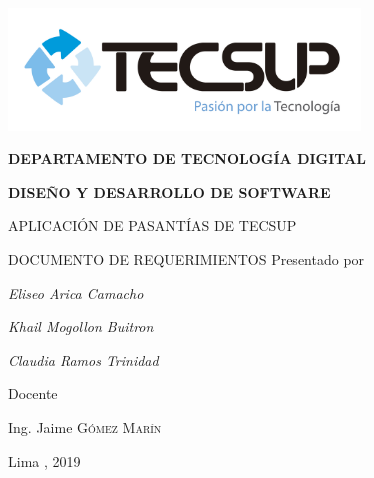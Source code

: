 \begin{titlepage}
	\centering
	\includegraphics[width=0.70\textwidth]{img/logo_tecsup_final}\par\vspace{1cm}
	\vspace{0.30cm}	
	{\scshape\large\bfseries DEPARTAMENTO DE TECNOLOG\'IA DIGITAL\par}
	\vspace{0.60cm}	
	{\scshape\large\bfseries DISEÑO Y DESARROLLO DE SOFTWARE  \par}
	\vspace{2.00cm}		
	{\large\large APLICACIÓN DE PASANTÍAS DE TECSUP \par}
	\vspace{0.60cm}
	{\scshape\large DOCUMENTO DE REQUERIMIENTOS }
	\vspace{0.60cm}
	\vfill
	Presentado por \par
	{\large\itshape {Eliseo Arica Camacho}\par}
	{\large\itshape {Khail Mogollon Buitron}\par}
	{\large\itshape {Claudia Ramos Trinidad}\par}
	\vspace{0.30cm}
	\vfill
	Docente \par
	Ing. Jaime  \textsc{ Gómez Marín}
	
  \vspace{0.30cm}
	\vfill
        {\large Lima , 2019 \par}
\end{titlepage}

